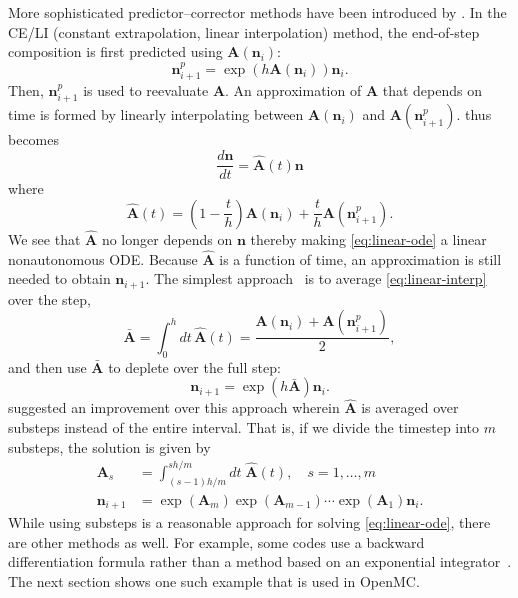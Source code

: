 \documentclass[3p,authoryear]{elsarticle}
\newcommand{\vect}[1]{\mathbf{#1}} %
\begin{document}
More sophisticated predictor--corrector methods have been introduced by
\citet{isotalo2011ane2,isotalo2011ane3}. In the CE/LI (constant extrapolation,
linear interpolation) method, the end-of-step composition is first predicted
using $\vect{A}(\vect{n}_i)$:
\begin{equation}
  \vect{n}_{i+1}^p = \exp \left( h\vect{A}(\vect{n}_i) \right) \vect{n}_i.
\end{equation}
Then, $\vect{n}_{i+1}^p$ is used to reevaluate $\vect{A}$. An approximation of
$\vect{A}$ that depends on time is formed by linearly interpolating between
$\vect{A}(\vect{n}_i)$ and $\vect{A}\left(\vect{n}_{i+1}^p\right)$.
 thus becomes
\begin{equation}
  \label{eq:linear-ode}
  \frac{d\vect{n}}{dt} = \hat{\vect{A}}(t) \vect{n}
\end{equation}
where
\begin{equation}
  \label{eq:linear-interp}
  \hat{\vect{A}}(t) = \left ( 1 - \frac{t}{h} \right) \vect{A}(\vect{n}_i) +
  \frac{t}{h} \vect{A}\left(\vect{n}_{i+1}^p \right).
\end{equation}
We see that $\hat{\vect{A}}$ no longer depends on $\vect{n}$ thereby making
\cref{eq:linear-ode} a linear nonautonomous ODE. Because $\hat{\vect{A}}$ is a
function of time, an approximation is still needed to obtain $\vect{n}_{i+1}$.
The simplest approach~\citep{isotalo2011ane2} is to average
\cref{eq:linear-interp} over the step,
\begin{equation}
  \bar{\vect{A}} = \int_0^h dt \, \hat{\vect{A}}(t) = \frac{\vect{A}(\vect{n}_i)
  + \vect{A}(\vect{n}_{i+1}^p)}{2},
\end{equation}
and then use $\bar{\vect{A}}$ to deplete over the full step:
\begin{equation}
  \vect{n}_{i+1} = \exp \left ( h \bar{\vect{A}} \right ) \vect{n}_i.
\end{equation}
\citet{isotalo2011ane3} suggested an improvement over this approach wherein
$\hat{\vect{A}}$ is averaged over substeps instead of the entire interval. That
is, if we divide the timestep into $m$ substeps, the solution is given by
\begin{equation}
  \begin{split}
    \label{eq:celi-substeps}
    \vect{A}_s &= \int_{(s-1)h/m}^{sh/m} dt \; \hat{\vect{A}}(t), \quad s=1,\dots,m \\
    \vect{n}_{i+1} &= \exp\left(\vect{A}_m \right) \exp \left(\vect{A}_{m-1}\right)
    \cdots \exp\left(\vect{A}_1\right) \vect{n}_i.
  \end{split}
\end{equation}
While using substeps is a reasonable approach for solving \cref{eq:linear-ode},
there are other methods as well. For example, some codes use a backward
differentiation formula rather than a method based on an exponential
integrator~\citep{carpenter2009mc,hykes2017mc,sublet2017nds}. The next section
shows one such example that is used in OpenMC.
\end{document}
